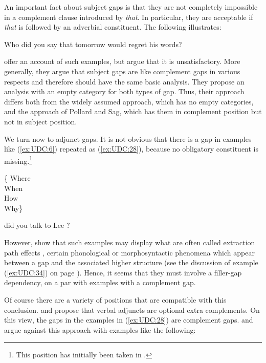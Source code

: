 \documentclass[output=paper
                ,modfonts
                ,nonflat
	        ,collection
	        ,collectionchapter
	        ,collectiontoclongg
 	        ,biblatex
                ,babelshorthands
                ,newtxmath
                ,draftmode
                ,colorlinks, citecolor=brown
]{./langsci/langscibook}
\begin{document}
{An important fact about subject gaps is that they are not completely
impossible in a complement clause introduced by \emph{that}. In
particular, they are acceptable if \emph{that} is followed by an
adverbial constituent. The following illustrates:

\begin{exe}
\ex \label{ex:UDC:27}
Who did you say that tomorrow \gap{} would regret his words?
\end{exe}

\noindent
\citet{Ginzburg:Sag:01} offer an account of such examples, but
\citet{Levine:Hukari:06} argue that it is unsatisfactory. More generally, they
argue that subject gaps are like complement gaps in various respects
and therefore should have the same basic analysis. They propose an
analysis with an empty category for both types of gap. Thus, their
approach differs both from the widely assumed approach, which has no
empty categories, and the approach of Pollard and Sag, which has them
in complement position but not in subject position.

We turn now to adjunct gaps. It is not obvious that there is a gap in
examples like (\ref{ex:UDC:6}) repeated as (\ref{ex:UDC:28}), because
no obligatory constituent is missing.\footnote{This position has initially
  been taken in \citet{Pollard:Sag:94}. } 

\begin{exe}
\ex \label{ex:UDC:28}
\begin{avm} 
  \{ \normalfont Where\\ \normalfont When\\ \normalfont How\\
  \normalfont Why\}
\end{avm}
did you talk to Lee \gap{}?
\end{exe}

\noindent
However, \cite{hukari.levine:adjunct} show that such examples may display
what are often called extraction path effects , certain phonological or
morphosyntactic phenomena which appear between a gap and the associated
higher structure (see the discussion of example (\ref{ex:UDC:34}) on
page \pageref{ex:UDC:34}). Hence, it seems that they must
involve a filler-gap dependency, on a par with examples with a
complement gap.

Of course there are a variety of positions that are compatible with this
conclusion. \citet{Bouma:Malouf:Sag:01} and \citet[168, fn.~2]{Ginzburg:Sag:01} propose that verbal adjuncts are optional extra complements.
On this view, the gaps in the examples in (\ref{ex:UDC:28}) are complement gaps.
\citet{Levine:03} and \citet{Levine:Hukari:06} argue against this approach
with examples like the following:

}
\end{document}
